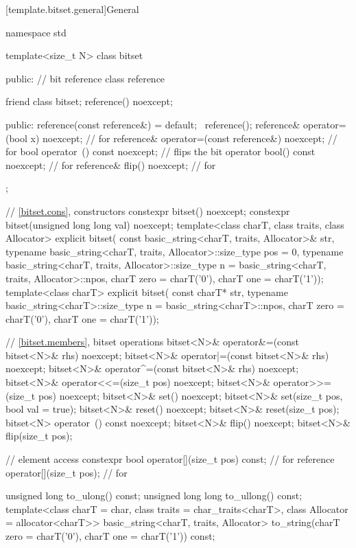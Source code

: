 [template.bitset.general]{General}%
%
\begin{codeblock}
namespace std {
  template<size_t N> class bitset {
  public:
    // bit reference
    class reference {
      friend class bitset;
      reference() noexcept;

    public:
      reference(const reference&) = default;
      ~reference();
      reference& operator=(bool x) noexcept;            // for 
      reference& operator=(const reference&) noexcept;  // for 
      bool operator~() const noexcept;                  // flips the bit
      operator bool() const noexcept;                   // for 
      reference& flip() noexcept;                       // for 
    };

    // \ref{bitset.cons}, constructors
    constexpr bitset() noexcept;
    constexpr bitset(unsigned long long val) noexcept;
    template<class charT, class traits, class Allocator>
      explicit bitset(
        const basic_string<charT, traits, Allocator>& str,
        typename basic_string<charT, traits, Allocator>::size_type pos = 0,
        typename basic_string<charT, traits, Allocator>::size_type n
          = basic_string<charT, traits, Allocator>::npos,
        charT zero = charT('0'),
        charT one = charT('1'));
    template<class charT>
      explicit bitset(
        const charT* str,
        typename basic_string<charT>::size_type n = basic_string<charT>::npos,
        charT zero = charT('0'),
        charT one = charT('1'));

    // \ref{bitset.members}, bitset operations
    bitset<N>& operator&=(const bitset<N>& rhs) noexcept;
    bitset<N>& operator|=(const bitset<N>& rhs) noexcept;
    bitset<N>& operator^=(const bitset<N>& rhs) noexcept;
    bitset<N>& operator<<=(size_t pos) noexcept;
    bitset<N>& operator>>=(size_t pos) noexcept;
    bitset<N>& set() noexcept;
    bitset<N>& set(size_t pos, bool val = true);
    bitset<N>& reset() noexcept;
    bitset<N>& reset(size_t pos);
    bitset<N>  operator~() const noexcept;
    bitset<N>& flip() noexcept;
    bitset<N>& flip(size_t pos);

    // element access
    constexpr bool operator[](size_t pos) const;        // for 
    reference operator[](size_t pos);                   // for 

    unsigned long to_ulong() const;
    unsigned long long to_ullong() const;
    template<class charT = char,
             class traits = char_traits<charT>,
             class Allocator = allocator<charT>>
      basic_string<charT, traits, Allocator>
        to_string(charT zero = charT('0'), charT one = charT('1')) const;

}}
\end{codeblock}
